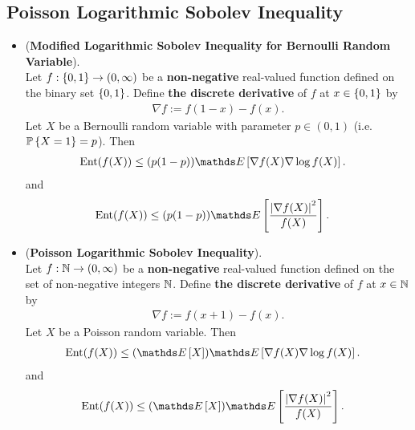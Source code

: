 \documentclass[11pt]{article}
\begin{document}
\subsection{Poisson Logarithmic Sobolev Inequality}
\begin{itemize}
\item \begin{proposition} (\textbf{Modified Logarithmic Sobolev Inequality for Bernoulli Random Variable}). \citep{boucheron2013concentration}\\
Let $f: \left\{0, 1\right\} \to (0,\infty)$ be a \textbf{non-negative} real-valued function defined on the binary set $\left\{0, 1\right\}$. Define \textbf{the discrete derivative} of $f$ at $x \in \left\{0, 1\right\}$ by 
\begin{align*}
\nabla f := f(1 - x) - f(x).
\end{align*} Let $X$ be a Bernoulli random variable with parameter $p \in (0,1)$ (i.e. ${\mathbb P}\left\{X = 1\right\} =p$). Then
\begin{align}
\text{Ent}(f(X)) &\le (p(1-p))\E{}{\nabla f(X) \nabla \log f(X)}.  \label{ineqn: log_sobolev_inequality_bernoulli_v0}
\end{align}
and
\begin{align}
\text{Ent}(f(X)) &\le  (p(1-p))\E{}{\frac{\abs{\nabla f(X)}^2}{f(X)}}.  \label{ineqn: log_sobolev_inequality_bernoulli}
\end{align}
\end{proposition}


\item \begin{proposition} (\textbf{Poisson Logarithmic Sobolev Inequality}). \citep{boucheron2013concentration}\\
Let $f: {\mathbb N} \to (0,\infty)$ be a \textbf{non-negative} real-valued function defined on the set of non-negative integers ${\mathbb N}$. Define \textbf{the discrete derivative} of $f$ at $x \in {\mathbb N}$ by 
\begin{align*}
\nabla f := f(x + 1) - f(x).
\end{align*} Let $X$ be a Poisson random variable. Then
\begin{align}
\text{Ent}(f(X)) &\le (\E{}{X})\E{}{\nabla f(X) \nabla \log f(X)}.  \label{ineqn: log_sobolev_inequality_poisson_v0}
\end{align}
and
\begin{align}
\text{Ent}(f(X)) &\le (\E{}{X})\E{}{\frac{\abs{\nabla f(X)}^2}{f(X)}}.  \label{ineqn: log_sobolev_inequality_poisson}
\end{align}
\end{proposition}
\end{itemize}
\end{document}
